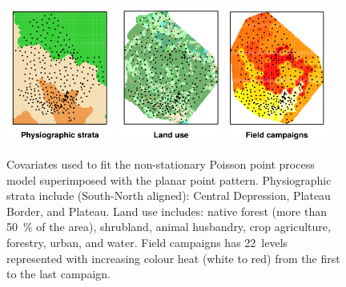 \begin{figure}[!h]
 \centering
 \includegraphics[width=0.32\textwidth]{fig/chap07-covarsA}
 \includegraphics[width=0.305\textwidth]{fig/chap07-covarsB}
 \includegraphics[width=0.3\textwidth]{fig/chap07-covarsC}

 \caption{Covariates used to fit the non-stationary Poisson point process model superimposed with the planar 
 point pattern. Physiographic strata include (South-North aligned): Central Depression, Plateau 
 Border, and Plateau. Land use includes: native forest (more than \SI{50}{\percent} of the area), 
 shrubland, animal husbandry, crop agriculture, forestry, urban, and water. Field campaigns has
 \num{22}~levels represented with increasing colour heat (white to red) from the first to the last campaign.}
 \label{fig:chap07-covars}
\end{figure}

